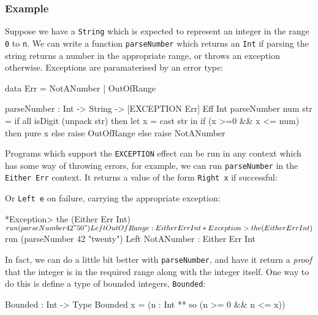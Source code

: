 \subsubsection*{Example}

Suppose we have a \texttt{String} which is expected to represent an integer in
the range \texttt{0} to \texttt{n}. We can write a function \texttt{parseNumber}
which returns an \texttt{Int} if parsing the string returns a number in the
appropriate range, or throws an exception otherwise. Exceptions are
paramaterised by an error type:

\begin{code}
data Err = NotANumber | OutOfRange

parseNumber : Int -> String -> { [EXCEPTION Err] } Eff Int
parseNumber num str
   = if all isDigit (unpack str)
        then let x = cast str in
             if (x >=0 && x <= num)
                then pure x
                else raise OutOfRange
        else raise NotANumber
\end{code}

\noindent
Programs which support the \texttt{EXCEPTION} effect can be run in any
context which has some way of throwing errors, for example, we can run
\texttt{parseNumber} in the \texttt{Either Err} context. It returns
a value of the form \texttt{Right x} if successful:


\noindent
Or \texttt{Left e} on failure, carrying the appropriate exception:

\begin{code}
*Exception> the (Either Err Int) $ run (parseNumber 42 "50")
Left OutOfRange : Either Err Int

*Exception> the (Either Err Int) $ run (parseNumber 42 "twenty")
Left NotANumber : Either Err Int
\end{code}

\noindent
In fact, we can do a little bit better with \texttt{parseNumber}, and have it
return a \emph{proof} that the integer is in the required range along with
the integer itself. One way to do this is define a type of bounded integers,
\texttt{Bounded}:

\begin{code}
Bounded : Int -> Type
Bounded x = (n : Int ** so (n >= 0 && n <= x))
\end{code}

